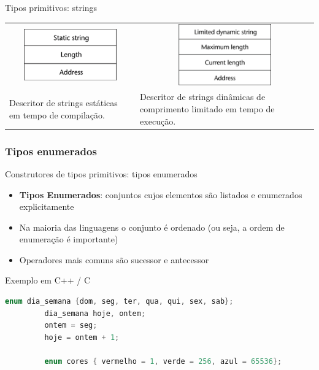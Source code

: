\documentclass[handout]{beamer}
\begin{document}
\begin{frame}[fragile]{Tipos primitivos: strings}
\begin{center}
\begin{tabular}{p{5cm}p{5cm}}
\multicolumn{1}{c}{\includegraphics[width=4cm]{figuras/stringestatica.pdf}}    &
\multicolumn{1}{c}{\includegraphics[width=4cm]{figuras/stringdinamica.pdf}} \\
Descritor de strings estáticas em tempo de compilação. &
Descritor de strings dinâmicas de comprimento limitado em tempo de execução. \\
\end{tabular}
\end{center}



\end{frame}

\subsubsection{Tipos enumerados}

\begin{frame}[fragile]{Construtores de tipos primitivos: tipos enumerados}
   \begin{itemize}
			\item \textbf{Tipos Enumerados}: conjuntos cujos elementos são listados e enumerados explicitamente
			\item Na maioria das linguagens o conjunto é ordenado (ou seja, a ordem de enumeração é importante)
			\item Operadores mais comuns são sucessor e antecessor
	\end{itemize}
\begin{block}{Exemplo em C++ / C}
	\begin{lstlisting}[language=C,numbers=none]
         enum dia_semana {dom, seg, ter, qua, qui, sex, sab};
         dia_semana hoje, ontem;
         ontem = seg;
         hoje = ontem + 1;

         enum cores { vermelho = 1, verde = 256, azul = 65536};
	\end{lstlisting}
\end{block}
\end{frame}
\end{document}
